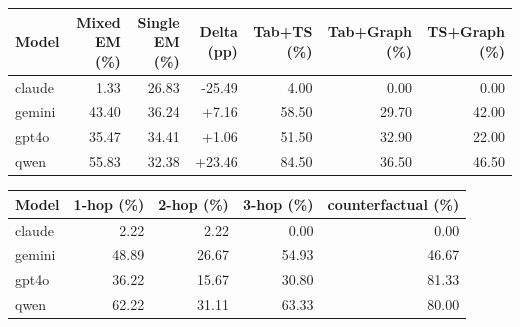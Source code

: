 \begin{tabular}{lrrrrrr}
\toprule
Model & Mixed EM (\%) & Single EM (\%) & Delta (pp) & Tab+TS (\%) & Tab+Graph (\%) & TS+Graph (\%) \\
\midrule
claude & 1.33 & 26.83 & -25.49 & 4.00 & 0.00 & 0.00 \\
gemini & 43.40 & 36.24 & +7.16 & 58.50 & 29.70 & 42.00 \\
gpt4o & 35.47 & 34.41 & +1.06 & 51.50 & 32.90 & 22.00 \\
qwen & 55.83 & 32.38 & +23.46 & 84.50 & 36.50 & 46.50 \\
\bottomrule
\end{tabular}

\begin{tabular}{lrrrr}
\toprule
Model & 1-hop (\%) & 2-hop (\%) & 3-hop (\%) & counterfactual (\%) \\
\midrule
claude & 2.22 & 2.22 & 0.00 & 0.00 \\
gemini & 48.89 & 26.67 & 54.93 & 46.67 \\
gpt4o & 36.22 & 15.67 & 30.80 & 81.33 \\
qwen & 62.22 & 31.11 & 63.33 & 80.00 \\
\bottomrule
\end{tabular}
